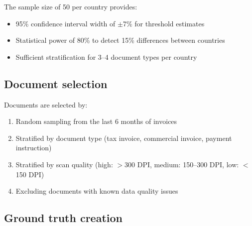 The sample size of 50 per country provides:
\begin{itemize}
  \item 95\% confidence interval width of $\pm$7\% for threshold estimates
  \item Statistical power of 80\% to detect 15\% differences between countries
  \item Sufficient stratification for 3--4 document types per country
\end{itemize}

\subsection{Document selection}

Documents are selected by:
\begin{enumerate}
  \item Random sampling from the last 6 months of invoices
  \item Stratified by document type (tax invoice, commercial invoice, payment
        instruction)
  \item Stratified by scan quality (high: $>$300 DPI, medium: 150--300 DPI,
        low: $<$150 DPI)
  \item Excluding documents with known data quality issues
\end{enumerate}

\subsection{Ground truth creation}

